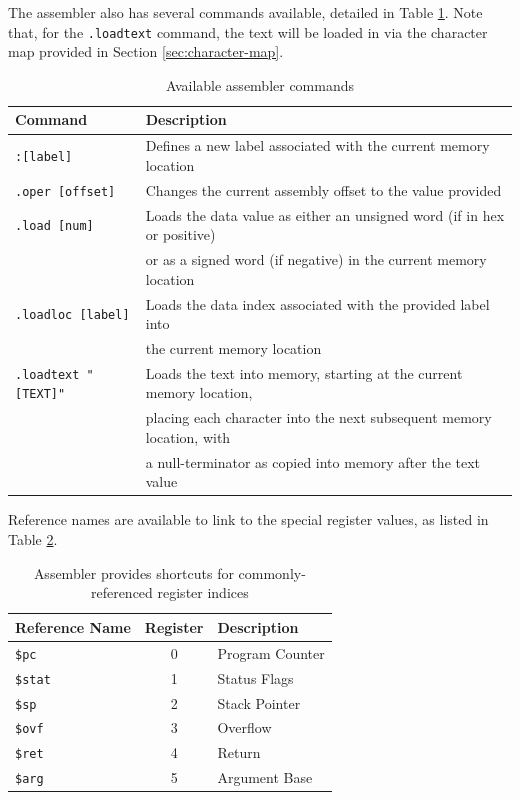 \documentclass{article}
\begin{document}
\pagebreak

The assembler also has several commands available, detailed in Table \ref{table:assembler-commands}. Note that, for the \texttt{.loadtext} command, the text will be loaded in via the character map provided in Section \ref{sec:character-map}.

\begin{table}[h!]
    \centering
    \begin{tabular}{l|l}
        \hline
        Command & Description \\
        \hline
        \texttt{:[label]} & Defines a new label associated with the current memory location \\
        \texttt{.oper [offset]} & Changes the current assembly offset to the value provided \\
        \texttt{.load [num]} & Loads the data value as either an unsigned word (if in hex or positive)\\
        & or as a signed word (if negative) in the current memory location \\
        \texttt{.loadloc [label]} & Loads the data index associated with the provided label into \\
        & the current memory location \\
        \texttt{.loadtext "[TEXT]"} & Loads the text into memory, starting at the current memory location, \\
        & placing each character into the next subsequent memory location, with \\
        & a null-terminator as copied into memory after the text value \\
        \hline
    \end{tabular}
    \caption{Available assembler commands}
    \label{table:assembler-commands}
\end{table}

Reference names are available to link to the special register values, as listed in Table \ref{table:assembler-register-references}.

\begin{table}[h!]
    \centering
    \begin{tabular}{l|cl}
        \hline
        Reference Name & Register & Description \\
        \hline
        \texttt{\$pc} & 0 & Program Counter \\
        \texttt{\$stat} & 1 & Status Flags \\
        \texttt{\$sp} & 2 & Stack Pointer \\
        \texttt{\$ovf} & 3 & Overflow \\
        \texttt{\$ret} & 4 & Return \\
        \texttt{\$arg} & 5 & Argument Base \\
        \hline
    \end{tabular}
    \caption{Assembler provides shortcuts for commonly-referenced register indices}
    \label{table:assembler-register-references}
\end{table}
\end{document}
